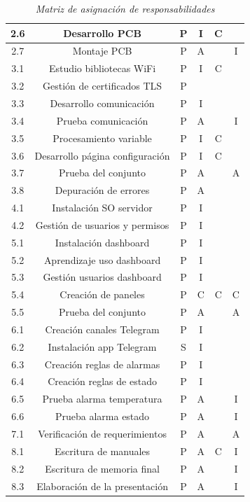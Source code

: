\documentclass[11pt]{charter}
\begin{document}
\begin{table}[htpb]
{\begin{tabular}{|c|c|c|c|c|c|}
 2.6&Desarrollo PCB  & P  & I & C &\\ \hline
 2.7&Montaje PCB  & P  & A &  & I\\ \hline
 3.1&Estudio bibliotecas WiFi  & P & I & C &\\ \hline
 3.2&Gestión de certificados TLS  & P &  &  &\\ \hline
 3.3&Desarrollo comunicación  & P & I &  &\\ \hline
 3.4&Prueba comunicación  & P & A &  & I\\ \hline
 3.5&Procesamiento variable  & P  & I & C &\\ \hline
 3.6&Desarrollo página configuración & P  & I & C &\\ \hline
 3.7&Prueba del conjunto  & P & A &  & A\\ \hline
 3.8&Depuración de errores  & P & A &  &\\ \hline
 4.1&Instalación SO servidor  & P & I &  &\\ \hline
 4.2&Gestión de usuarios y permisos & P & I &  &\\ \hline
 5.1&Instalación dashboard  & P & I &  &\\ \hline 
 5.2&Aprendizaje uso dashboard  & P & I &  &\\ \hline
 5.3&Gestión usuarios dashboard  & P & I &  &\\ \hline
 5.4&Creación de paneles  & P & C & C & C\\ \hline
 5.5&Prueba del conjunto  & P & A &  & A\\ \hline
 6.1&Creación canales Telegram  & P & I &  &\\ \hline
 6.2&Instalación app Telegram & S & I &  &  \\ \hline
 6.3&Creación reglas de alarmas & P & I &  &\\ \hline
 6.4&Creación reglas de estado & P & I &  &\\ \hline
 6.5&Prueba alarma temperatura & P & A &  & I\\ \hline
 6.6&Prueba alarma estado & P & A &  & I \\ \hline
 7.1&Verificación de requerimientos & P & A &  & A\\ \hline
 8.1&Escritura de manuales & P & A & C & I\\ \hline
 8.2&Escritura de memoria final & P & A &  & I\\ \hline
 8.3&Elaboración de la presentación & P & A &  & I\\ \hline

\end{tabular}%
}
\vspace{.5cm}
\caption{\textit{Matriz de asignación de responsabilidades}}
\label{tab:resp}
\end{table}
\end{document}
